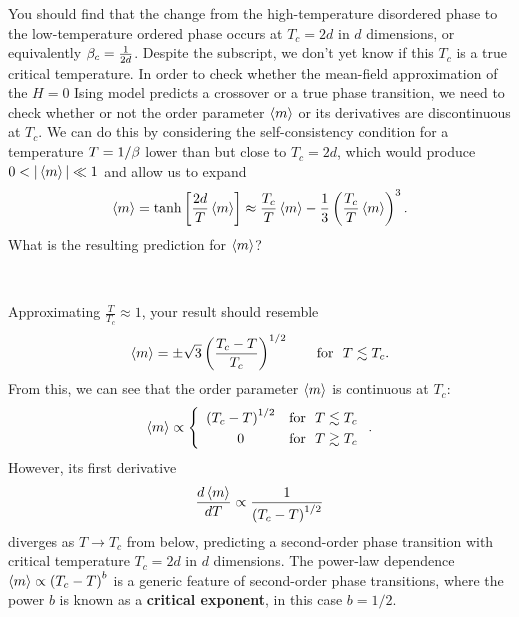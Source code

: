 You should find that the change from the high-temperature disordered phase to the low-temperature ordered phase occurs at $T_c = 2d$ in $d$ dimensions, or equivalently $\beta_c = \frac{1}{2d}$.
Despite the subscript, we don't yet know if this $T_c$ is a true critical temperature.
In order to check whether the mean-field approximation of the $H = 0$ Ising model predicts a crossover or a true phase transition, we need to check whether or not the order parameter $\left\langle m \right\rangle$ or its derivatives are discontinuous at $T_c$.
We can do this by considering the self-consistency condition for a temperature $T = 1 / \beta$ lower than but close to $T_c = 2d$, which would produce $0 < |\left\langle m \right\rangle| \ll 1$ and allow us to expand
\begin{equation*}
  \left\langle m \right\rangle = \tanh\left[\frac{2d}{T} \left\langle m \right\rangle\right] \approx \frac{T_c}{T} \left\langle m \right\rangle - \frac{1}{3}\left(\frac{T_c}{T} \left\langle m \right\rangle\right)^3.
\end{equation*}
What is the resulting prediction for $\left\langle m \right\rangle$?
\begin{mdframed}
  \ \\[100 pt]
\end{mdframed}

Approximating $\frac{T}{T_c} \approx 1$, your result should resemble
\begin{equation*}
  \left\langle m \right\rangle = \pm \sqrt{3} \left(\frac{T_c - T}{T_c}\right)^{1 / 2} \qquad \mbox{for } \ T \lesssim T_c.
\end{equation*}
From this, we can see that the order parameter $\left\langle m \right\rangle$ is continuous at $T_c$:
\begin{equation}
  \left\langle m \right\rangle \propto \left\{\begin{array}{cl} \left(T_c - T\right)^{1 / 2} & \mbox{for } \ T \lesssim T_c \\[3 pt]
                                           0                            & \mbox{for } \ T \gtrsim T_c\end{array}\right. .
\end{equation}
However, its first derivative
\begin{equation*}
  \frac{d\left\langle m \right\rangle}{dT} \propto \frac{1}{\left(T_c - T\right)^{1 / 2}}
\end{equation*}
diverges as $T \to T_c$ from below, predicting a second-order phase transition with critical temperature $T_c = 2d$ in $d$ dimensions.
The power-law dependence $\left\langle m \right\rangle \propto \left(T_c - T\right)^b$ is a generic feature of second-order phase transitions, where the power $b$ is known as a \textbf{critical exponent}, in this case $b = 1 / 2$.

